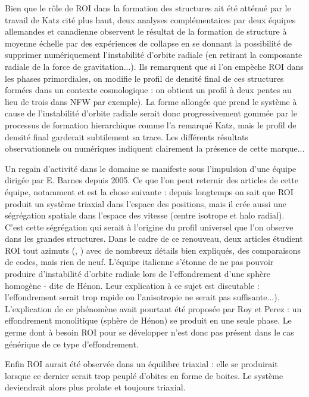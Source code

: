 Bien que le r\^{o}le de ROI dans la formation des structures ait été atténué par le travail de Katz \cite{katz} cit\'{e} plus haut, deux analyses
compl\'{e}mentaires par deux \'{e}quipes allemandes \cite{huss} et canadienne \cite{macmillan} observent le r\'{e}sultat de la formation de structure à moyenne \'{e}chelle par des exp\'{e}riences de collapse en se donnant la possibilit\'{e} de supprimer numériquement l'instabilit\'{e} d'orbite radiale (en retirant la composante radiale de la force de gravitation...). 
Ils remarquent que si l'on empèche ROI dans les phases primordiales, on modifie le profil de densité final de ces structures formées dans un contexte cosmologique : on obtient un profil à deux pentes au lieu de trois dans NFW par exemple). La forme allongée que prend le système à cause de l'instabilité d'orbite radiale serait donc progressivement gommée par le processus de formation hierarchique comme l'a remarqué Katz, mais le profil de densité final garderait subtilement sa trace. Les différents résultats observationnels ou numériques indiquent clairement la présence de cette marque...   

Un regain d'activit\'{e} dans le domaine se manifeste sous l'impulsion d'une
\'{e}quipe dirig\'{e}e par E. Barnes depuis 2005. Ce que l'on peut reternir des articles de cette équipe, notamment \cite{barnes2005} et \cite{ROI_Moderne} est la chose suivante : depuis longtemps on
sait que ROI produit un syst\`{e}me triaxial dans l'espace des positions, mais
il cr\'{e}e aussi une s\'{e}gr\'{e}gation spatiale dans l'espace des vitesse
(centre isotrope et halo radial). C'est cette s\'{e}gr\'{e}gation qui serait
\`{a} l'origine du profil universel que l'on observe dans les grandes
structures. Dans le cadre de ce renouveau, deux articles
\'{e}tudient ROI tout azimuts (\cite{barneslanzel}, \cite{trenti}) avec de nombreux d\'{e}tails 
bien expliqu\'{e}s, des comparaisons de codes,  mais rien de neuf.  L'équipe italienne \cite{trenti} s'\'{e}tonne de ne
pas pouvoir produire d'instabilité d'orbite radiale lors de l'effondrement d'une sphère homogène - dite de Hénon. Leur
explication à ce sujet est discutable  : l'effondrement serait trop rapide ou l'anisotropie ne serait pas
suffisante...). L'explication de ce ph\'{e}nom\`{e}ne avait pourtant \'{e}t\'{e} propos\'{e}e par Roy et Perez
\cite{roy} : un effondrement monolitique (sphère de Hénon) se produit en une seule phase.  Le germe dont à besoin ROI pour se développer n'est donc pas présent dans le cas générique de ce type d'effondrement. 


Enfin ROI aurait \'{e}t\'{e} observ\'{e}e dans un \'{e}quilibre triaxial
\cite{antonini} : elle se produirait lorsque ce dernier serait trop peupl\'{e} d'obites en forme de boites. Le syst\`{e}me deviendrait
alors plus prolate et toujours triaxial.



